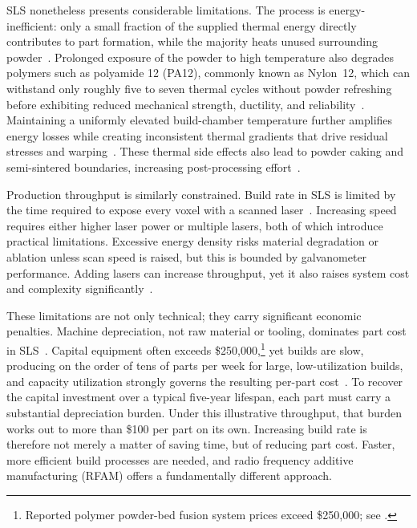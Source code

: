 SLS nonetheless presents considerable limitations. The process is
energy-inefficient: only a small fraction of the supplied thermal energy
directly contributes to part formation, while the majority heats unused
surrounding powder~\cite{jabri2023comprehensive,peyre2015sls,lupone2021process}.
Prolonged exposure of the powder to high temperature also degrades polymers such
as polyamide 12 (PA12), commonly known as Nylon~12, which can withstand only roughly
five to seven thermal cycles without powder refreshing before exhibiting reduced
mechanical strength, ductility, and
reliability~\cite{verbelen2016characterization,zhao2018crystallization,pham2008deterioration,choren2001sls,gornet2002characterization,zarringhalam2006effects}.
Maintaining a uniformly elevated build-chamber temperature further amplifies
energy losses while creating inconsistent thermal gradients that drive residual
stresses and warping~\cite{bourell2014performance,jabri2023comprehensive}. These
thermal side effects also lead to powder caking and semi-sintered boundaries,
increasing post-processing effort~\cite{xiao2024sls}.

Production throughput is similarly constrained. Build rate in SLS is limited
by the time required to expose every voxel with a scanned
laser~\cite{deckard1995improved}. Increasing speed requires either higher laser
power or multiple lasers, both of which introduce practical limitations. Excessive
energy density risks material degradation or ablation unless scan speed is raised,
but this is bounded by galvanometer performance. Adding lasers can increase
throughput, yet it also raises system cost and complexity
significantly~\cite{bourell2014performance,xiao2024sls}.

These limitations are not only technical; they carry significant economic
penalties. Machine depreciation, not raw material or tooling, dominates part cost
in SLS~\cite{lindemann2012lifecyclecosts,rickenbacher2013slmcostmodel}.
Capital equipment often exceeds
\$250{,}000,\footnote{Reported polymer powder-bed fusion system prices exceed
\$250{,}000; see \textcite{khajavi2014spareparts}.} yet builds are slow, producing
on the order of tens of parts per week for large, low-utilization builds, and
capacity utilization strongly governs the resulting per-part
cost~\cite{baumers2011capacityutilization}. To recover the capital
investment over a typical five-year lifespan, each part must carry a substantial
depreciation burden. Under this illustrative throughput, that burden works out to
more than \$100 per part on its own. Increasing build
rate is therefore not merely a matter of saving time, but of reducing part cost.
Faster, more efficient build processes are needed, and radio frequency additive manufacturing (RFAM) offers a
fundamentally different approach.

